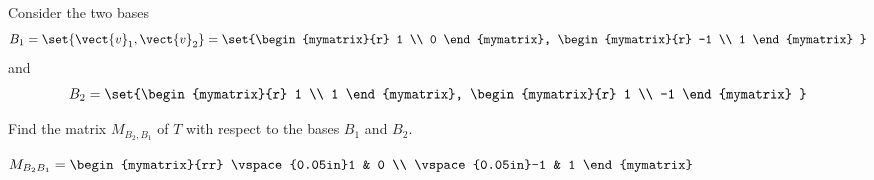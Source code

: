 \begin{enumialphparenastyle}
\begin{ex}
Consider the two bases
\[
B_1 = \set{\vect{v}_{1}, \vect{v}_{2} } = \set{\begin{mymatrix}{r}
1 \\
0
\end{mymatrix}, \begin{mymatrix}{r}
-1 \\
1
\end{mymatrix}
}
\]
 and 
\[
B_2 = \set{\begin{mymatrix}{r}
1 \\
1
\end{mymatrix}, \begin{mymatrix}{r}
1 \\
-1
\end{mymatrix}
}
\]

Find the matrix $M_{B_2,B_1}$ of $T$ with respect to the bases $B_1$ and $B_2$. 
\begin{sol}
$
M_{B_{2} B_{1}} = \begin{mymatrix}{rr}
\vspace{0.05in}1 & 0 \\
\vspace{0.05in}-1 & 1 
\end{mymatrix} $
\end{sol}
\end{ex}

\end{enumialphparenastyle}